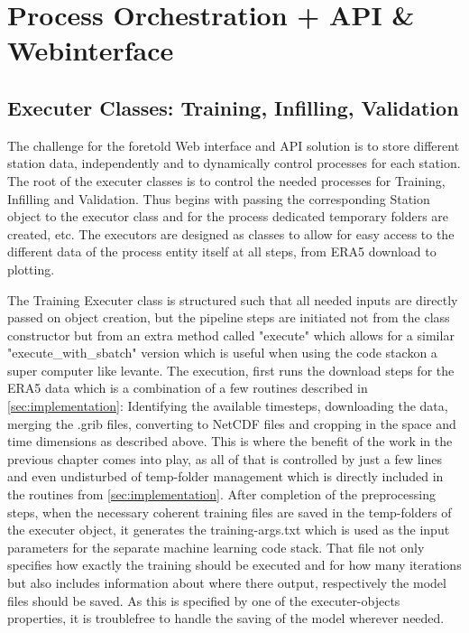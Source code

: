 
\section{Process Orchestration + API \& Webinterface}
\label{sec:process_orchestration}



\subsection{Executer Classes: Training, Infilling, Validation}

The challenge for the foretold Web interface and API solution is to store different station data, independently and to dynamically control processes for each station. The root of the executer classes is to control the needed processes for Training, Infilling and Validation. Thus begins with passing the corresponding Station object to the executor class and for the process dedicated temporary folders are created, etc. The executors are designed as classes to allow for easy access to the different data of the process entity itself at all steps, from ERA5 download to plotting.

The Training Executer class is structured such that all needed inputs are directly passed on object creation, but the pipeline steps are initiated not from the class constructor but from an extra method called "execute" which allows for a similar "execute_with_sbatch" version which is useful when using the code stackon a super computer like levante.
The execution, first runs the download steps for the ERA5 data which is a combination of a few routines described in \autoref{sec:implementation}: Identifying the available timesteps, downloading the data, merging the .grib files, converting to NetCDF files and cropping in the space and time dimensions as described above. This is where the benefit of the work in the previous chapter comes into play, as all of that is controlled by just a few lines and even undisturbed of temp-folder management which is directly included in the routines from \autoref{sec:implementation}.
After completion of the preprocessing steps, when the necessary coherent training files are saved in the temp-folders of the executer object, it generates the training-args.txt which is used as the input parameters for the separate machine learning code stack. That file not only specifies how exactly the training should be executed and for how many iterations but also includes information about where there output, respectively the model files should be saved. As this is specified by one of the executer-objects properties, it is troublefree to handle the saving of the model wherever needed.

